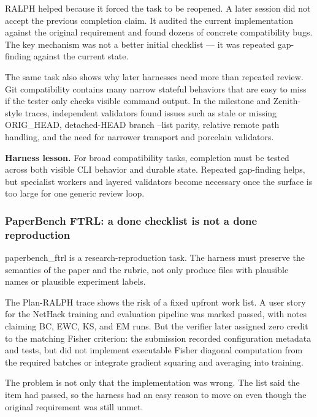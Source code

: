 \documentclass[11pt,a4paper]{article}
\newcommand{\code}[1]{#1}
\begin{document}
RALPH helped because it forced the task to be reopened. A later session did not accept the previous completion claim. It audited the current implementation against the original requirement and found dozens of concrete compatibility bugs. The key mechanism was not a better initial checklist --- it was repeated gap-finding against the current state.

The same task also shows why later harnesses need more than repeated review. Git compatibility contains many narrow stateful behaviors that are easy to miss if the tester only checks visible command output. In the milestone and Zenith-style traces, independent validators found issues such as stale or missing \code{ORIG\_HEAD}, detached-HEAD \code{branch --list} parity, relative remote path handling, and the need for narrower transport and porcelain validators.

\begin{takeaway}
\textbf{Harness lesson.} For broad compatibility tasks, completion must be tested across both visible CLI behavior and durable state. Repeated gap-finding helps, but specialist workers and layered validators become necessary once the surface is too large for one generic review loop.
\end{takeaway}

\subsubsection{PaperBench FTRL: a done checklist is not a done reproduction}

\code{paperbench\_ftrl} is a research-reproduction task. The harness must preserve the semantics of the paper and the rubric, not only produce files with plausible names or plausible experiment labels.

The Plan-RALPH trace shows the risk of a fixed upfront work list. A user story for the NetHack training and evaluation pipeline was marked \code{passed}, with notes claiming BC, EWC, KS, and EM runs. But the verifier later assigned zero credit to the matching Fisher criterion: the submission recorded configuration metadata and tests, but did not implement executable Fisher diagonal computation from the required batches or integrate gradient squaring and averaging into training.

The problem is not only that the implementation was wrong. The list said the item had passed, so the harness had an easy reason to move on even though the original requirement was still unmet.
\end{document}
